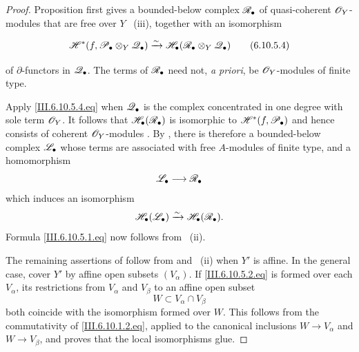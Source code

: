 \begin{proof}
Proposition  first gives a bounded-below
complex $\mathscr{R}_\bullet$  of quasi-coherent
$\mathscr{O}_Y$-modules that are free over $Y$
~(iii), together with an isomorphism
\begin{env}[6.10.5.4]
\label{III.6.10.5.4}
\[
  \mathscr{H}^*
  (f,\mathscr{P}_\bullet\otimes_Y\mathscr{Q}_\bullet)
  \xrightarrow{\sim}
  \mathscr{H}_\bullet
  (\mathscr{R}_\bullet\otimes_Y\mathscr{Q}_\bullet)
  \tag{6.10.5.4}\label{III.6.10.5.4.eq}
\]
\end{env}
of $\partial$-functors in $\mathscr{Q}_\bullet$.  The terms of
$\mathscr{R}_\bullet$ need not, \emph{a priori}, be
$\mathscr{O}_Y$-modules of finite type.

Apply \eqref{III.6.10.5.4.eq} when $\mathscr{Q}_\bullet$ is the
complex concentrated in one degree with sole term $\mathscr{O}_Y$.
It follows that $\mathscr{H}_\bullet(\mathscr{R}_\bullet)$ is isomorphic to
$\mathscr{H}^*(f,\mathscr{P}_\bullet)$ and hence consists of coherent
$\mathscr{O}_Y$-modules .  By
, there is therefore a bounded-below complex
$\mathscr{L}_\bullet$ whose terms are associated with free
$A$-modules of finite type, and a homomorphism
\[
  \mathscr{L}_\bullet\longrightarrow\mathscr{R}_\bullet
\]
which induces an isomorphism
\[
  \mathscr{H}_\bullet(\mathscr{L}_\bullet)
  \xrightarrow{\sim}
  \mathscr{H}_\bullet(\mathscr{R}_\bullet).
\]
Formula \eqref{III.6.10.5.1.eq} now follows from
~(ii).

The remaining assertions of  follow from
 and ~(ii) when $Y'$ is
affine.  In the general case, cover $Y'$ by affine open subsets
$(V_\alpha)$.  If
\eqref{III.6.10.5.2.eq} is formed over each $V_\alpha$, its
restrictions from $V_\alpha$ and $V_\beta$ to an affine open
subset
\[
  W\subset V_\alpha\cap V_\beta
\]
both coincide with the isomorphism formed over $W$.  This
follows from the commutativity of
\eqref{III.6.10.1.2.eq}, applied to the canonical inclusions
$W\to V_\alpha$ and $W\to V_\beta$, and proves that the local
isomorphisms glue.
\end{proof}

